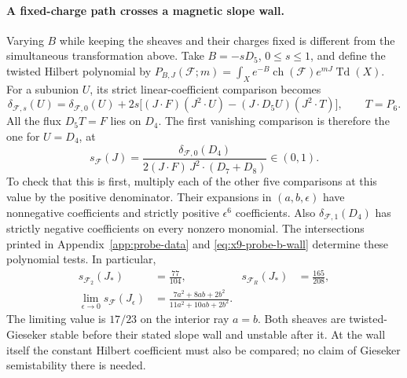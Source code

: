 \paragraph{A fixed-charge path crosses a magnetic slope wall.}
Varying $B$ while keeping the sheaves and their charges fixed is
different from the simultaneous transformation above. Take
$B=-sD_5$, $0\leq s\leq1$, and define the twisted Hilbert polynomial
by $P_{B,J}(\mathcal F;m)=\int_X e^{-B}\operatorname{ch}(\mathcal F)
e^{mJ}\operatorname{Td}(X)$. For a subunion $U$, its strict
linear-coefficient comparison becomes
\begin{equation}
 \delta_{\mathcal F,s}(U)=\delta_{\mathcal F,0}(U)
 +2s\big[(J\cdot F)(J^2\cdot U)
             -(J\cdot D_5U)(J^2\cdot T)\big],
 \qquad T=P_6.
 \label{eq:x9-probe-b-wall}
\end{equation}
All the flux $D_5T=F$ lies on $D_4$. The first vanishing comparison
is therefore the one for $U=D_4$, at
\begin{equation}
 s_{\mathcal F}(J)=
 \frac{\delta_{\mathcal F,0}(D_4)}
 {2(J\cdot F)\,J^2\cdot(D_7+D_8)}\in(0,1).
 \label{eq:x9-probe-first-wall}
\end{equation}
To check that this is first, multiply each of the other five
comparisons at this value by the positive denominator. Their
expansions in $(a,b,\epsilon)$ have nonnegative coefficients and
strictly positive $\epsilon^6$ coefficients. Also
$\delta_{\mathcal F,1}(D_4)$ has strictly negative coefficients
on every nonzero monomial. The intersections printed in Appendix~\ref{app:probe-data}
and \eqref{eq:x9-probe-b-wall} determine these polynomial tests.
In particular,
\begin{equation}
 \begin{aligned}
 s_{\mathcal F_2}(J_*)&=\frac{77}{104},&
 s_{\mathcal F_R}(J_*)&=\frac{165}{208},\\
 \lim_{\epsilon\to0}s_{\mathcal F}(J_\epsilon)
 &=\frac{7a^2+8ab+2b^2}{11a^2+10ab+2b^2}.
 \end{aligned}
 \label{eq:x9-probe-wall-values}
\end{equation}
The limiting value is $17/23$ on the interior ray $a=b$.
Both sheaves are twisted-Gieseker stable before their stated slope
wall and unstable after it. At the wall itself the constant Hilbert
coefficient must also be compared; no claim of Gieseker
semistability there is needed.

